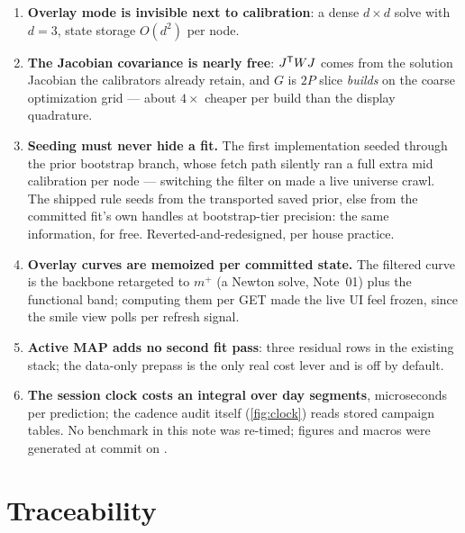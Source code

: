 \documentclass[11pt]{article}
\begin{document}
\begin{enumerate}[leftmargin=1.6em]
\item \textbf{Overlay mode is invisible next to calibration}: a dense
$d\times d$ solve with $d=3$, state storage $O(d^2)$ per node.
\item \textbf{The Jacobian covariance is nearly free}: $J^{\mathsf{T}} WJ$ comes
from the solution Jacobian the calibrators already retain, and $G$ is
$2P$ slice \emph{builds} on the coarse optimization grid --- about
$4\times$ cheaper per build than the display quadrature.
\item \textbf{Seeding must never hide a fit.}  The first implementation
seeded through the prior bootstrap branch, whose fetch path silently ran
a full extra mid calibration per node --- switching the filter on made a
live universe crawl.  The shipped rule seeds from the transported saved
prior, else from the committed fit's own handles at bootstrap-tier
precision: the same information, for free.  Reverted-and-redesigned,
per house practice.
\item \textbf{Overlay curves are memoized per committed state.}  The
filtered curve is the backbone retargeted to $m^+$ (a Newton solve,
Note~01) plus the functional band; computing them per GET made the live
UI feel frozen, since the smile view polls per refresh signal.
\item \textbf{Active MAP adds no second fit pass}: three residual rows
in the existing stack; the data-only prepass is the only real cost
lever and is off by default.
\item \textbf{The session clock costs an integral over day segments},
microseconds per prediction; the cadence audit itself
(\cref{fig:clock}) reads stored campaign tables.  No benchmark in this
note was re-timed; figures and macros were generated at commit
\texttt{\ktrgencommit} on \ktrgendate.
\end{enumerate}

\section{Traceability}
\label{app:trace}
\end{document}
